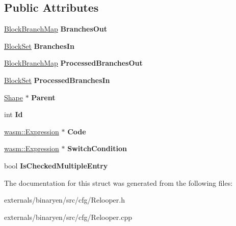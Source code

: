 \subsection*{Public Attributes}
\begin{DoxyCompactItemize}
\item 
\mbox{\label{struct_c_f_g_1_1_block_a3519da503a5364a1ae60a6fbf83ae674}} 
\mbox{\hyperlink{struct_c_f_g_1_1_insert_ordered_map}{Block\+Branch\+Map}} {\bfseries Branches\+Out}
\item 
\mbox{\label{struct_c_f_g_1_1_block_a917f84022d4aa1e28b6d0c5e4169579a}} 
\mbox{\hyperlink{struct_c_f_g_1_1_insert_ordered_set}{Block\+Set}} {\bfseries Branches\+In}
\item 
\mbox{\label{struct_c_f_g_1_1_block_a0342f810178f98d4e8b3420253c79688}} 
\mbox{\hyperlink{struct_c_f_g_1_1_insert_ordered_map}{Block\+Branch\+Map}} {\bfseries Processed\+Branches\+Out}
\item 
\mbox{\label{struct_c_f_g_1_1_block_a717461eba2fbed80cfc5414556eaa075}} 
\mbox{\hyperlink{struct_c_f_g_1_1_insert_ordered_set}{Block\+Set}} {\bfseries Processed\+Branches\+In}
\item 
\mbox{\label{struct_c_f_g_1_1_block_a431eb452ef6e30b9a2c767a7dee37d36}} 
\mbox{\hyperlink{struct_c_f_g_1_1_shape}{Shape}} $\ast$ {\bfseries Parent}
\item 
\mbox{\label{struct_c_f_g_1_1_block_a8acb489ff078c03165731f7fbd5510de}} 
int {\bfseries Id}
\item 
\mbox{\label{struct_c_f_g_1_1_block_a9e3ccf1120df4cf260ff94b707d64eb8}} 
\mbox{\hyperlink{classwasm_1_1_expression}{wasm\+::\+Expression}} $\ast$ {\bfseries Code}
\item 
\mbox{\label{struct_c_f_g_1_1_block_aff077dbcefe0407b4feaed861c4de700}} 
\mbox{\hyperlink{classwasm_1_1_expression}{wasm\+::\+Expression}} $\ast$ {\bfseries Switch\+Condition}
\item 
\mbox{\label{struct_c_f_g_1_1_block_a45ec4edb5e5a695fc29c25ce2f642c81}} 
bool {\bfseries Is\+Checked\+Multiple\+Entry}
\end{DoxyCompactItemize}


The documentation for this struct was generated from the following files\+:\begin{DoxyCompactItemize}
\item 
externals/binaryen/src/cfg/Relooper.\+h\item 
externals/binaryen/src/cfg/Relooper.\+cpp\end{DoxyCompactItemize}
